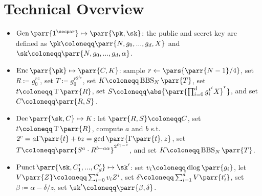 \section{Technical Overview}
\label{sec:overview}

\begin{itemize}
    \item \(\Gen\parr{1^\secpar} \mapsto \parr{\pk,\sk}\):
    the public and secret key are defined as \(\pk \coloneqq \parr{N, g_0, ..., g_d, X}\) and \(\sk \coloneqq \parr{N, g_0, ..., g_d, \alpha}\).
    
    \item \(\Enc\parr{\pk} \mapsto \parr{C,K}\):
    sample \(r \gets \pars{\parr{N-1}/4}\),
    set \(R \coloneqq g_0^{r z}\),
    set \(T \coloneqq g_0^{r 2^{\ell_{\mathsf{T}}}}\),
    set \(K \coloneqq \operatorname{BBS}_N\parr{T}\),
    set \(t \coloneqq \operatorname{T}\parr{R}\),
    set \(S \coloneqq \abs{\parr{\prod_{i=0}^d g_i^{t^i} X}^r}\),
    and set \(C \coloneqq \parr{R,S}\).

    \item \(\Dec\parr{\sk,C} \mapsto K\):
    let \(\parr{R,S} \coloneqq C\),
    set \(t \coloneqq \operatorname{T}\parr{R}\),
    compute \(a\) and \(b\) s.t.\ \(2^c = a \Gamma\parr{t} + b z = \gcd\parr{\Gamma\parr{t}, z}\),
    set \(T \coloneqq \parr{S^a \cdot R^{b - a \alpha}}^{2^{\ell_{\mathsf{T}}-c}}\),
    and set \(K \coloneqq \operatorname{BBS}_N\parr{T}\).

    \item \(\Punct\parr{\sk,C'_1,...,C'_d} \mapsto \sk'\):
    set \(v_i \coloneqq \operatorname{dlog}\parr{g_i}\),
    let \(V\parr{Z} \coloneqq \sum_{i=0}^d v_i Z^i\),
    set \(\delta \coloneqq \sum_{i=1}^d V\parr{t'_i}\),
    set \(\beta \coloneqq \alpha - \delta/z\),
    set \(\sk' \coloneqq \parr{\beta, \delta}\).
\end{itemize}